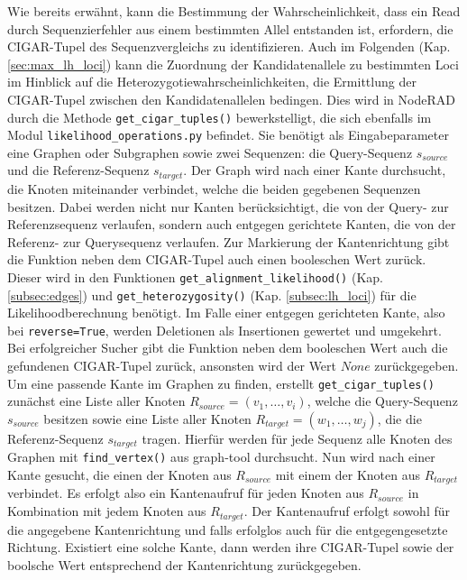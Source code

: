 Wie bereits erwähnt, kann die Bestimmung der Wahrscheinlichkeit, dass ein Read durch Sequenzierfehler aus einem bestimmten Allel entstanden ist, erfordern, die CIGAR-Tupel des Sequenzvergleichs zu identifizieren. Auch im Folgenden (Kap. \ref{sec:max_lh_loci}) kann die Zuordnung der Kandidatenallele zu bestimmten Loci im Hinblick auf die Heterozygotiewahrscheinlichkeiten, die Ermittlung der CIGAR-Tupel zwischen den Kandidatenallelen bedingen. Dies wird in NodeRAD durch die Methode \lstinline|get_cigar_tuples()| bewerkstelligt, die sich ebenfalls im Modul \lstinline|likelihood_operations.py| befindet. Sie benötigt als Eingabeparameter eine Graphen oder Subgraphen sowie zwei Sequenzen: die Query-Sequenz $ s_{source} $ und die Referenz-Sequenz $ s_{target} $. Der Graph wird nach einer Kante durchsucht, die Knoten miteinander verbindet, welche die beiden gegebenen Sequenzen besitzen. Dabei werden nicht nur Kanten berücksichtigt, die von der Query- zur Referenzsequenz verlaufen, sondern auch entgegen gerichtete Kanten, die von der Referenz- zur Querysequenz verlaufen. Zur Markierung der Kantenrichtung gibt die Funktion neben dem CIGAR-Tupel auch einen booleschen Wert zurück. Dieser wird in den Funktionen \lstinline|get_alignment_likelihood()| (Kap. \ref{subsec:edges}) und \lstinline|get_heterozygosity()| (Kap. \ref{subsec:lh_loci}) für die Likelihoodberechnung benötigt. Im Falle einer entgegen gerichteten Kante, also bei \lstinline|reverse=True|, werden Deletionen als Insertionen gewertet und umgekehrt. Bei erfolgreicher Sucher gibt die Funktion neben dem booleschen Wert auch die gefundenen CIGAR-Tupel zurück, ansonsten wird der Wert $ None $ zurückgegeben.\\

Um eine passende Kante im Graphen zu finden, erstellt \lstinline|get_cigar_tuples()| zunächst eine Liste aller Knoten $ R_{source} = (v_{1}, \dots, v_{i})$, welche die Query-Sequenz $ s_{source} $ besitzen sowie eine Liste aller Knoten $ R_{target} = (w_{1}, \dots, w_{j}) $, die die Referenz-Sequenz $ s_{target} $ tragen. Hierfür werden für jede Sequenz alle Knoten des Graphen mit \lstinline|find_vertex()| aus graph-tool durchsucht. Nun wird nach einer Kante gesucht, die einen der Knoten aus $ R_{source} $ mit einem der Knoten aus $ R_{target} $ verbindet. Es erfolgt also ein Kantenaufruf für jeden Knoten aus $ R_{source} $ in Kombination mit jedem  Knoten aus $ R_{target} $. Der Kantenaufruf erfolgt sowohl für die angegebene Kantenrichtung und falls erfolglos auch für die entgegengesetzte Richtung. Existiert eine solche Kante, dann werden ihre CIGAR-Tupel sowie der boolsche Wert entsprechend der Kantenrichtung zurückgegeben. \\

